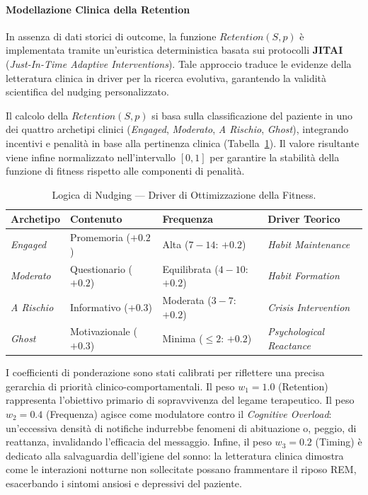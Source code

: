 \paragraph{Modellazione Clinica della Retention}
In assenza di dati storici di outcome, la funzione $Retention(S, p)$ è implementata tramite un'euristica deterministica basata sui protocolli \textbf{JITAI} (\textit{Just-In-Time Adaptive Interventions}). Tale approccio traduce le evidenze della letteratura clinica in driver per la ricerca evolutiva, garantendo la validità scientifica del nudging personalizzato.

Il calcolo della $Retention(S, p)$ si basa sulla classificazione del paziente in uno dei quattro archetipi clinici (\textit{Engaged}, \textit{Moderato}, \textit{A Rischio}, \textit{Ghost}), integrando incentivi e penalità in base alla pertinenza clinica (Tabella~\ref{tab:ga_expert_system}). Il valore risultante viene infine normalizzato nell'intervallo $[0, 1]$ per garantire la stabilità della funzione di fitness rispetto alle componenti di penalità.

\begin{table}[H]
    \centering
    \caption{Logica di Nudging --- Driver di Ottimizzazione della Fitness.}
    \label{tab:ga_expert_system}
    \begin{tabular}{@{}llll@{}}
        \toprule
        \textbf{Archetipo} & \textbf{Contenuto}     & \textbf{Frequenza}           & \textbf{Driver Teorico}          \\ \midrule
        \textit{Engaged}   & Promemoria ($+0.2$)    & Alta ($7-14$: $+0.2$)        & \textit{Habit Maintenance}       \\
        \textit{Moderato}  & Questionario ($+0.2$)  & Equilibrata ($4-10$: $+0.2$) & \textit{Habit Formation}         \\
        \textit{A Rischio} & Informativo ($+0.3$)   & Moderata ($3-7$: $+0.2$)     & \textit{Crisis Intervention}     \\
        \textit{Ghost}     & Motivazionale ($+0.3$) & Minima ($\leq 2$: $+0.2$)    & \textit{Psychological Reactance} \\ \bottomrule
    \end{tabular}
\end{table}
I coefficienti di ponderazione sono stati calibrati per riflettere una precisa gerarchia di priorità clinico-comportamentali. Il peso $w_1 = 1.0$ (Retention) rappresenta l'obiettivo primario di sopravvivenza del legame terapeutico. Il peso $w_2 = 0.4$ (Frequenza) agisce come modulatore contro il \textit{Cognitive Overload}: un'eccessiva densità di notifiche indurrebbe fenomeni di abituazione o, peggio, di reattanza, invalidando l'efficacia del messaggio. Infine, il peso $w_3 = 0.2$ (Timing) è dedicato alla salvaguardia dell'igiene del sonno: la letteratura clinica dimostra come le interazioni notturne non sollecitate possano frammentare il riposo REM, esacerbando i sintomi ansiosi e depressivi del paziente.

